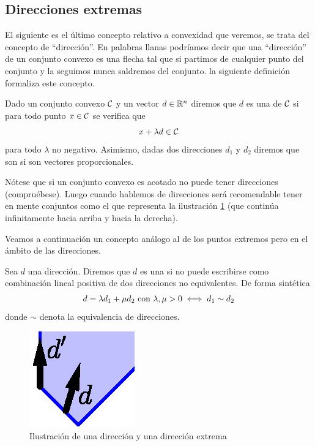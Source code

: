\subsection{Direcciones extremas}
El siguiente es el último concepto relativo a convexidad que veremos, se trata del concepto de ``dirección''. En palabras llanas podríamos decir que una ``dirección'' de un conjunto convexo es una flecha tal que si partimos de cualquier punto del conjunto y la seguimos nunca saldremos del conjunto. la siguiente definición formaliza este concepto.
\begin{defi}[Dirección]
	Dado un conjunto convexo $\mathcal{C}$ y un vector $d\in\mathbb{R}^n$ diremos que $d$ es una  de $\mathcal{C}$ si para todo punto $x\in\mathcal{C}$ se verifica que
	\begin{equation*}
		x+\lambda d\in \mathcal{C}
	\end{equation*}
	para todo $\lambda$ no negativo. Asimismo, dadas dos direcciones $d_1$ y $d_2$ diremos que son  si son vectores proporcionales.
\end{defi}
\begin{obs}[No acotación]
	Nótese que si un conjunto convexo es acotado no puede tener direcciones (compruébese). Luego cuando hablemos de direcciones será recomendable tener en mente conjuntos como el que representa la ilustración \ref{fund_img_direcciones} (que continúa infinitamente hacia arriba y hacia la derecha).
\end{obs}
Veamos a continuación un concepto análogo al de los puntos extremos pero en el ámbito de las direcciones.
\begin{defi}
	Sea $d$ una dirección. Diremos que $d$ es una  si no puede escribirse como combinación lineal positiva de dos direcciones no equivalentes. De forma sintética
	\begin{equation*}
		d=\lambda d_1+\mu d_2\text{ con }\lambda,\mu>0\iff d_1\sim d_2
	\end{equation*}
	donde $\sim$ denota la equivalencia de direcciones.
\end{defi}
\begin{figure}[h!]
	\centering
	\includegraphics[scale = 0.75]{img/direcciones}
	\caption{Ilustración de una dirección y una dirección extrema}
	\label{fund_img_direcciones}
\end{figure}
